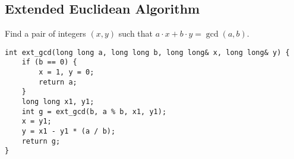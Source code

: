 \subsection{Extended Euclidean Algorithm}
Find a pair of integers $(x, y)$ such that $a \cdot x + b \cdot y = \gcd(a, b)$.
\begin{lstlisting}
int ext_gcd(long long a, long long b, long long& x, long long& y) {
    if (b == 0) {
        x = 1, y = 0;
        return a;
    }
    long long x1, y1;
    int g = ext_gcd(b, a % b, x1, y1);
    x = y1;
    y = x1 - y1 * (a / b);
    return g;
}
\end{lstlisting}